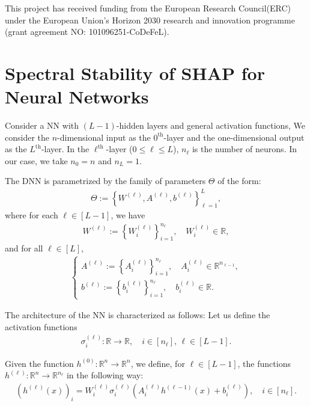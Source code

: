 \documentclass[letterpaper,11pt]{article}
\numberwithin{equation}{section}
\renewcommand{\leq}{\leqslant}
\numberwithin{equation}{section}
\begin{document}
This project has received funding from the European Research Council(ERC) under the European Union's Horizon 2030 research and innovation programme (grant agreement NO: 101096251-CoDeFeL).




\appendix 

\section{Spectral Stability of SHAP for Neural Networks}
\label{section:appendix}
Consider a NN with $(L-1)$-hidden layers and general activation functions, We consider the $n$-dimensional input as the $0^{\text{th}}$-layer and the one-dimensional output as the $L^{\text{th}}$-layer. In the $\ell^{\text{th}}$-layer ($0\leq \ell \leq L$), $n_\ell$ is the number of neurons. In our case, we take $n_0=n$ and $n_L=1$.

The DNN is parametrized by the family of parameters $\Theta$ of the form:
\begin{align*}
    \Theta:=\left\{ W^{(\ell)}, A^{(\ell)}, b^{(\ell)}\right\}_{\ell=1}^L,
\end{align*}
where for each $\ell\in [L-1]$, we have
\begin{align*}
    W^{(\ell)}:= \left\{W_i^{(\ell)}\right\}_{i=1}^{n_\ell},\quad W_i^{(\ell)}\in \mathbb{R},    
\end{align*}
and for all $\ell\in [L]$,
\begin{align*}
    \begin{cases} 
        A^{(\ell)}:= \left\{A_i^{(\ell)}\right\}_{i=1}^{n_\ell},\quad A_i^{(\ell)}\in \mathbb{R}^{n_{\ell-1}},\\
        b^{(\ell)}:= \left\{b_i^{(\ell)}\right\}_{i=1}^{n_\ell},\quad b_i^{(\ell)}\in \mathbb{R}.
    \end{cases}
\end{align*}

The architecture of the NN is characterized as follows:
Let us define the activation functions
    \begin{align}
        \label{def:sigma:i}
        \sigma_i^{(\ell)}: \mathbb{R}\to \mathbb{R},\quad i\in [n_{\ell}],\,  \ell\in [L-1].
    \end{align}

Given the function $h^{(0)}:\mathbb{R}^{n}\to \mathbb{R}^{n}$, we define, for $\ell\in [L-1]$, the functions $h^{(\ell)}:\mathbb{R}^{n}\to \mathbb{R}^{n_\ell}$ in the following way:
    \begin{align}
        \label{def:h:ell}
        (h^{(\ell)}(x))_i=W_i^{(\ell)} \sigma_i^{(\ell)} \left(A_i^{(\ell)} h^{(\ell-1)} (x) + b_i^{(\ell)}\right),\quad i\in [n_\ell]. 
    \end{align}
\end{document}
